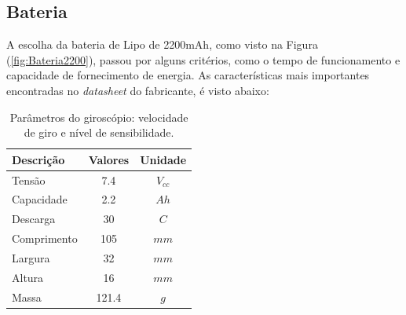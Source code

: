 \subsection{Bateria}

A escolha da bateria de Lipo de 2200mAh, como visto na Figura (\ref{fig:Bateria2200}), passou por alguns critérios, como o tempo de funcionamento e capacidade de fornecimento de energia. As características mais importantes encontradas no \textit{datasheet} do fabricante, é visto abaixo: 
\begin{table}[!htb]
    \centering
    \caption{Parâmetros do giroscópio: velocidade de giro e nível de sensibilidade.}
    \label{tab:ParamGiroMPU}
    \begin{tabular}{@{}lcc@{}}
        \toprule
        \textbf{Descrição} & \textbf{Valores} & \textbf{Unidade}              \\ 
        \midrule
        Tensão              & 7.4                       & $V_{cc}$     \\
        Capacidade          & 2.2                       & $Ah$         \\
        Descarga            & 30                        & $C$          \\
        Comprimento         & 105                       & $mm$         \\
        Largura             & 32                        & $mm$         \\
        Altura              & 16                        & $mm$         \\
        Massa               & 121.4                     & $g$          \\ 
        \bottomrule
    \end{tabular}
\end{table}

